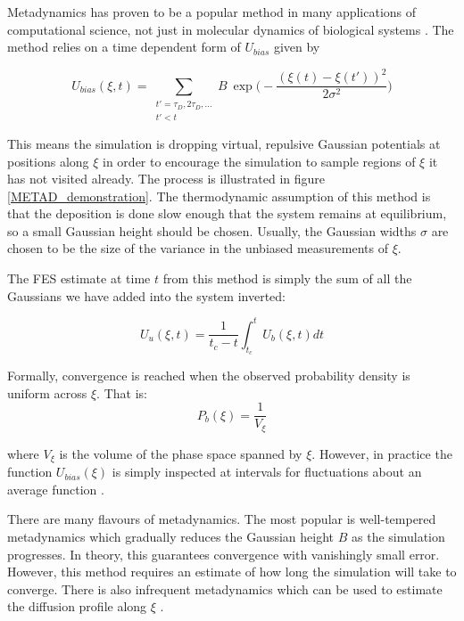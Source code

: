 Metadynamics has proven to be a popular method in many applications of computational science, not just in molecular dynamics of biological systems \cite{cheng2017, giberti2015, bussi2020a}. The method relies on a time dependent form of $U_{bias}$ given by 

\begin{equation}
	U_{bias} (\xi,t) = \sum\limits_{\substack{t' = \tau_D, 2 \tau_D,... \\ t' < t}}  B \ \exp\bigg( - \frac{(\xi(t) - \xi(t') )^2}{2\sigma^2 }\bigg)
\end{equation}

This means the simulation is dropping virtual, repulsive Gaussian potentials at positions along $\xi$ in order to encourage the simulation to sample regions of $\xi$ it has not visited already. The process is illustrated in figure \ref{METAD_demonstration}. The thermodynamic assumption of this method is that the deposition is done slow enough that the system remains at equilibrium, so a small Gaussian height should be chosen. Usually, the Gaussian widths $\sigma$ are chosen to be the size of the variance in the unbiased measurements of $\xi$. 

The FES estimate at time $t$ from this method is simply the sum of all the Gaussians we have added into the system inverted:  

\begin{equation}
	U_u (\xi,t)  =  \frac{1}{t_c-t} \int_{t_c}^t U_b(\xi,t) dt
\end{equation}

Formally, convergence is reached when the observed probability density is uniform across $\xi$. That is:
\begin{equation}
	P_b (\xi)= \frac{1}{V_\xi } 
	\label{convergence_criterion_metad}
\end{equation}

where $V_\xi$ is the volume of the phase space spanned by $\xi$. However, in practice the function $U_{bias}(\xi)$ is simply inspected at intervals for fluctuations about an average function \cite{sun2016}. 

There are many flavours of metadynamics. The most popular is well-tempered metadynamics which gradually reduces the Gaussian height $B$ as the simulation progresses\cite{barducci2008}. In theory, this guarantees convergence with vanishingly small error. However, this method requires an estimate of how long the simulation will take to converge. There is also infrequent metadynamics which can be used to estimate the diffusion profile along $\xi$ \cite{tiwary2013, tiwary2016, salvalaglio2014}.  


